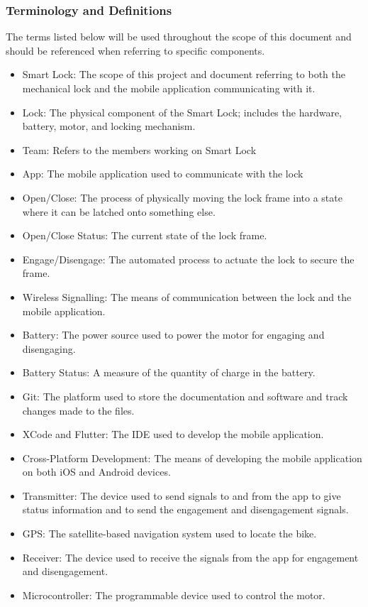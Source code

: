 \documentclass[12pt]{article}
\begin{document}
\subsubsection{Terminology and  Definitions}

The terms listed below will be used throughout the scope of this document and should be referenced when referring to specific components.  

\begin{itemize}
\item Smart Lock: The scope of this project and document referring to both the mechanical lock and the mobile application communicating with it. 
\item Lock: The physical component of the Smart Lock; includes the hardware, battery, motor, and locking mechanism.  
\item Team: Refers to the members working on Smart Lock 
\item App: The mobile application used to communicate with the lock 
\item Open/Close: The process of physically moving the lock frame into a state where it can be latched onto something else. 
\item Open/Close Status: The current state of the lock frame. 
\item Engage/Disengage: The automated process to actuate the lock to secure the frame. 
\item Wireless Signalling: The means of communication between the lock and the mobile application. 
\item Battery: The power source used to power the motor for engaging and disengaging. 
\item Battery Status: A measure of the quantity of charge in the battery. 
\item Git: The platform used to store the documentation and software and track changes made to the files. 
\item XCode and Flutter: The IDE used to develop the mobile application. 
\item Cross-Platform Development: The means of developing the mobile application on both iOS and Android devices. 
\item Transmitter: The device used to send signals to and from the app to give status information and to send the engagement and disengagement signals. 
\item GPS: The satellite-based navigation system used to locate the bike. 
\item Receiver: The device used to receive the signals from the app for engagement and disengagement. 
\item Microcontroller: The programmable device used to control the motor. 
\end{itemize}
~\newpage
\end{document}
